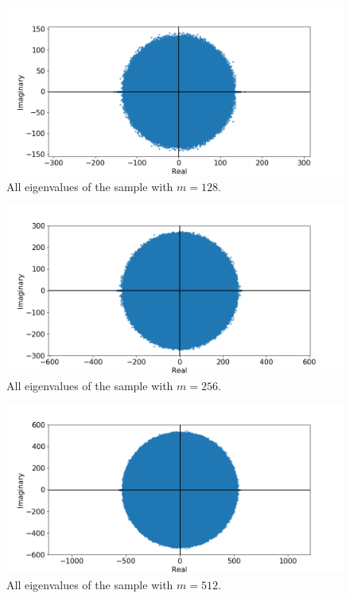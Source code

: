 \documentclass[a4paper, 11pt]{article}
\begin{document}
\begin{figure}
  \centering
  \includegraphics[width=\textwidth]{../2/square_evs/128.png}
  \caption{All eigenvalues of the sample with $m=128$.}
  \label{fig:evs_128}
\end{figure}
\begin{figure}
  \centering
  \includegraphics[width=\textwidth]{../2/square_evs/256.png}
  \caption{All eigenvalues of the sample with $m=256$.}
  \label{fig:evs_256}
\end{figure}
\begin{figure}
  \centering
  \includegraphics[width=\textwidth]{../2/square_evs/512.png}
  \caption{All eigenvalues of the sample with $m=512$.}
  \label{fig:evs_512}
\end{figure}
\end{document}
